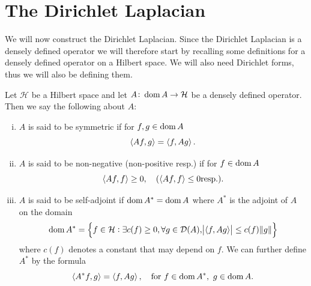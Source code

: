 \section{The Dirichlet Laplacian}\label{constructDirichletLaplacian}
We will now construct the Dirichlet Laplacian. Since the Dirichlet Laplacian is a densely defined operator we will therefore start by recalling some definitions for a densely defined operator on a Hilbert space. We will also need Dirichlet forms, thus we will also be defining them.

\medskip
\begin{defi}\label{selfAdjoint}
	Let $\mathcal{H}$ be a Hilbert space and let $A\colon \operatorname{dom} A \to \mathcal{H}$ be a densely defined operator. Then we say the following about $A$:
	\begin{enumerate}[(i)]
		\item $A$ is said to be symmetric if for $f,g \in \operatorname{dom} A$
		\begin{equation}
			\left\langle Af, g \right\rangle = \left\langle f, Ag \right\rangle.
		\end{equation}
		\item $A$ is said to be non-negative (non-positive resp.) if for $f \in \operatorname{dom} A$
		\begin{equation}
			\left\langle Af, f \right\rangle \geq 0, \quad (\left\langle Af, f \right\rangle \leq 0 \text{resp.}).
		\end{equation}
		\item $A$ is said to be self-adjoint if $\operatorname{dom} A^{*} = \operatorname{dom} A$ where $A^{*}$ is the adjoint of $A$ on the domain
		\begin{equation}
			\dom A^{*} = \cbr{f \in \mathcal{H} : \exists c(f) \geq 0, \forall g \in \mathcal{D}(A), \abs{\inn{f}{Ag}} \leq c(f) \norm{g}}
		\end{equation}
		where $c(f)$ denotes a constant that may depend on $f$. We can further define $A^*$ by the formula
		\begin{equation}
			\left\langle A^*f, g \right\rangle = \left\langle f, Ag \right\rangle , \quad \text{for } f \in \operatorname{dom} A^*, \  g \in \operatorname{dom} A.
		\end{equation}
	\end{enumerate}
\end{defi}

